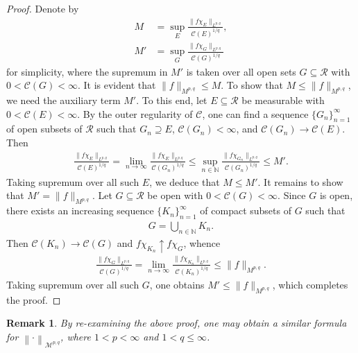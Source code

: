 \documentclass[10pt,reqno]{amsart}
\newtheorem{remark}[theorem]{Remark}
\numberwithin{equation}{section}
\begin{document}
\begin{proof}
Denote by 
\begin{align*}
M&=\sup_{E}\frac{\|f\chi_{E}\|_{L^{p,q}}}{\mathcal{C}(E)^{1/q}},\\
M'&=\sup_{G}\frac{\|f\chi_{G}\|_{L^{p,q}}}{\mathcal{C}(G)^{1/q}}
\end{align*}
for simplicity, where the supremum in $M'$ is taken over all open sets $G\subseteq\mathcal{R}$ with $0<\mathcal{C}(G)<\infty$. It is evident that $\|f\|_{M^{p,q}}\leq M$. To show that $M\leq\|f\|_{M^{p,q}}$, we need the auxiliary term $M'$. To this end, let $E\subseteq\mathcal{R}$ be measurable with $0<\mathcal{C}(E)<\infty$. By the outer regularity of $\mathcal{C}$, one can find a sequence $\{G_{n}\}_{n=1}^{\infty}$ of open subsets of $\mathcal{R}$ such that $G_{n}\supseteq E$, $\mathcal{C}(G_{n})<\infty$, and $\mathcal{C}(G_{n})\rightarrow\mathcal{C}(E)$. Then
\begin{align*}
\frac{\|f\chi_{E}\|_{L^{p,q}}}{\mathcal{C}(E)^{1/q}}=\lim_{n\rightarrow\infty}\frac{\|f\chi_{E}\|_{L^{p,q}}}{\mathcal{C}(G_{n})^{1/q}}\leq\sup_{n\in\mathbb{N}}\frac{\|f\chi_{G_{n}}\|_{L^{p,q}}}{\mathcal{C}(G_{n})^{1/q}}\leq M'.
\end{align*}
Taking supremum over all such $E$, we deduce that $M\leq M'$. It remains to show that $M'=\|f\|_{M^{p,q}}$. Let $G\subseteq\mathcal{R}$ be open with $0<\mathcal{C}(G)<\infty$. Since $G$ is open, there exists an increasing sequence $\{K_{n}\}_{n=1}^{\infty}$ of compact subsets of $G$ such that 
\begin{align*}
G=\bigcup_{n\in\mathbb{N}}K_{n}.
\end{align*}
Then $\mathcal{C}(K_{n})\rightarrow\mathcal{C}(G)$ and $f\chi_{K_{n}}\uparrow f\chi_{G}$, whence 
\begin{align*}
\frac{\|f\chi_{G}\|_{L^{p,q}}}{\mathcal{C}(G)^{1/q}}=\lim_{n\rightarrow\infty}\frac{\|f\chi_{K_{n}}\|_{L^{p,q}}}{\mathcal{C}(K_{n})^{1/q}}\leq\|f\|_{M^{p,q}}.
\end{align*}
Taking supremum over all such $G$, one obtains $M'\leq\|f\|_{M^{p,q}}$, which completes the proof.
\end{proof}

\begin{remark}
\rm By re-examining the above proof, one may obtain a similar formula for $\left\|\cdot\right\|_{\mathcal{M}^{p,q}}$, where $1<p<\infty$ and $1<q\leq\infty$.
\end{remark}
\end{document}
